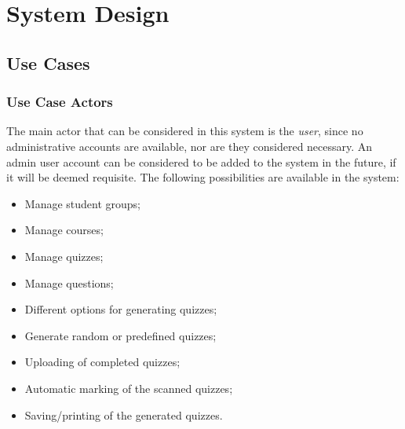 \section{System Design}


\subsection{Use Cases}

\subsubsection{Use Case Actors}
The main actor that can be considered in this system is the \textit{user}, since no administrative accounts are available, nor are they considered necessary. An admin user account can be considered to be added to the system in the future, if it will be deemed requisite. The following possibilities are available in the system:
\begin{itemize}
  \item Manage student groups;
  \item Manage courses;
  \item Manage quizzes;
  \item Manage questions;
  \item Different options for generating quizzes;
  \item Generate random or predefined quizzes;
  \item Uploading of completed quizzes;
  \item Automatic marking of the scanned quizzes;
  \item Saving/printing of the generated quizzes.
\end{itemize}

